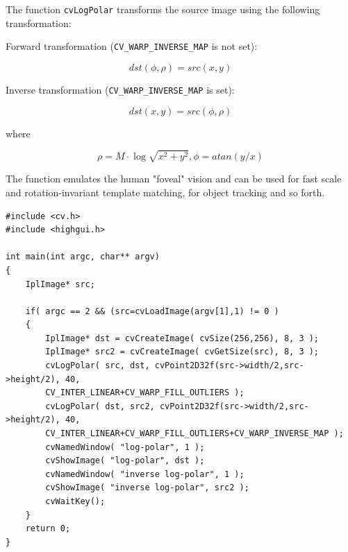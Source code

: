 \begin{description}
\end{description}

The function \texttt{cvLogPolar} transforms the source image using the following transformation:

Forward transformation (\texttt{CV\_WARP\_INVERSE\_MAP} is not set):

\[
dst(\phi,\rho) = src(x,y)
\]

Inverse transformation (\texttt{CV\_WARP\_INVERSE\_MAP} is set):

\[
dst(x,y) = src(\phi,\rho)
\]

where

\[
\rho = M \cdot \log{\sqrt{x^2 + y^2}},
\phi=atan(y/x)
\]

The function emulates the human "foveal" vision and can be used for fast scale and rotation-invariant template matching, for object tracking and so forth.


\begin{lstlisting}
#include <cv.h>
#include <highgui.h>

int main(int argc, char** argv)
{
    IplImage* src;

    if( argc == 2 && (src=cvLoadImage(argv[1],1) != 0 )
    {
        IplImage* dst = cvCreateImage( cvSize(256,256), 8, 3 );
        IplImage* src2 = cvCreateImage( cvGetSize(src), 8, 3 );
        cvLogPolar( src, dst, cvPoint2D32f(src->width/2,src->height/2), 40, 
		CV_INTER_LINEAR+CV_WARP_FILL_OUTLIERS );
        cvLogPolar( dst, src2, cvPoint2D32f(src->width/2,src->height/2), 40, 
		CV_INTER_LINEAR+CV_WARP_FILL_OUTLIERS+CV_WARP_INVERSE_MAP );
        cvNamedWindow( "log-polar", 1 );
        cvShowImage( "log-polar", dst );
        cvNamedWindow( "inverse log-polar", 1 );
        cvShowImage( "inverse log-polar", src2 );
        cvWaitKey();
    }
    return 0;
}
\end{lstlisting}

